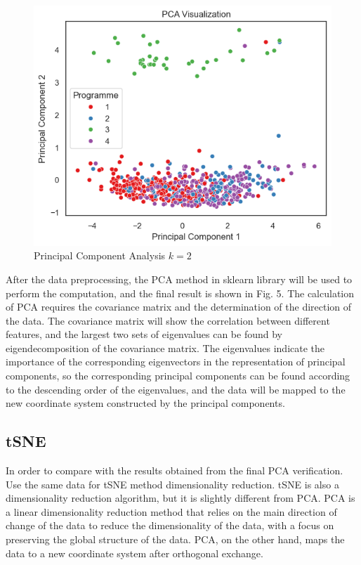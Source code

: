 \documentclass[twocolumn]{IEEEtran}
\begin{document}
\begin{figure}[H]
    \centering
    \includegraphics[scale=0.5]{./img/pca.png}
    \caption{Principal Component Analysis \(k=2\)}
\end{figure}
After the data preprocessing, the PCA method in sklearn library will be used to perform the computation, and the final result is shown in Fig. 5. The calculation of PCA requires the covariance matrix and the determination of the direction of the data. The covariance matrix will show the correlation between different features, and the largest two sets of eigenvalues can be found by eigendecomposition of the covariance matrix. The eigenvalues indicate the importance of the corresponding eigenvectors in the representation of principal components, so the corresponding principal components can be found according to the descending order of the eigenvalues, and the data will be mapped to the new coordinate system constructed by the principal components.

\subsection{tSNE}
In order to compare with the results obtained from the final PCA verification. Use the same data for tSNE method dimensionality reduction. tSNE is also a dimensionality reduction algorithm, but it is slightly different from PCA. PCA is a linear dimensionality reduction method that relies on the main direction of change of the data to reduce the dimensionality of the data, with a focus on preserving the global structure of the data. PCA, on the other hand, maps the data to a new coordinate system after orthogonal exchange.
\end{document}
